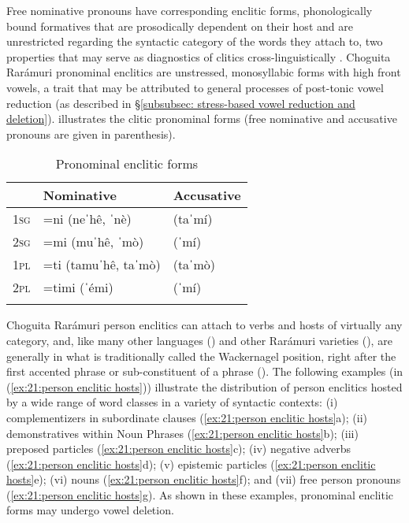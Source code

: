 Free nominative pronouns have corresponding enclitic forms, phonologically bound formatives that are prosodically dependent on their host and are unrestricted regarding the syntactic category of the words they attach to, two properties that may serve as diagnostics of clitics cross-linguistically \parencite{bickel2007inflectional}. Choguita Rarámuri pronominal enclitics are unstressed, monosyllabic forms with high front vowels, a trait that may be attributed to general processes of post-tonic vowel reduction (as described in §\ref{subsubsec: stress-based vowel reduction and deletion}).  illustrates the clitic pronominal forms (free nominative and accusative pronouns are given in parenthesis).


\begin{table}
\begin{tabularx}{.55\textwidth}{lll}
\lsptoprule
& \textbf{Nominative} & \textbf{Accusative}\\
\midrule
 \textsc{1sg} & =ni (neˈhê, ˈnè) & (taˈmí)\\
 \textsc{2sg} & =mi (muˈhê, ˈmò) & (ˈmí)\\
 \textsc{1pl} & =ti (tamuˈhê, taˈmò) & (taˈmò)\\
 \textsc{2pl} & =timi (ˈémi) & (ˈmí)\\
\lspbottomrule
\end{tabularx}
\caption{Pronominal enclitic forms}
\label{tab:21:22}
\end{table}



Choguita Rarámuri person enclitics can attach to verbs and hosts of virtually any category, and, like many other  languages (\citealt{steele1976law}) and other Rarámuri varieties (\citealt{moralesmoreno2016rochecahi}), are generally in what is traditionally called the Wackernagel position, right after the first accented phrase or sub-constituent of a phrase (\citealt{bickel2007inflectional}). The following examples (in (\ref{ex:21:person enclitic hosts})) illustrate the distribution of person enclitics hosted by a wide range of word classes in a variety of syntactic contexts: (i) complementizers in subordinate clauses (\ref{ex:21:person enclitic hosts}a); (ii) demonstratives within Noun Phrases (\ref{ex:21:person enclitic hosts}b); (iii) preposed particles (\ref{ex:21:person enclitic hosts}c); (iv) negative adverbs (\ref{ex:21:person enclitic hosts}d); (v) epistemic particles (\ref{ex:21:person enclitic hosts}e); (vi) nouns (\ref{ex:21:person enclitic hosts}f); and (vii) free person pronouns (\ref{ex:21:person enclitic hosts}g). As shown in these examples, pronominal enclitic forms may undergo vowel deletion.

